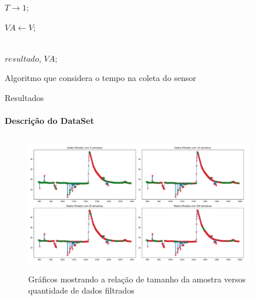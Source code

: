 \documentclass[]{beamer}
\begin{document}
\begin{frame}[allowframebreaks]
{\begin{algorithm}[H]
{{				
				$T \rightarrow 1$;   \\
	
	
				$VA \leftarrow V$;  \\
			}
	
	
			 \\
			\Retorna $resultado$, $VA$; 
		}
		\caption{Algoritmo que considera o tempo na coleta do sensor}
		\label{algoritmo:alg_com_temp}
	\end{algorithm}
	}

\end{frame}

\begin{frame}{Resultados}
	\framesubtitle{Descrição do DataSet}
	\begin{figure}[!htb]	
		\begin{center}
			\includegraphics[width=10cm,height=6cm]{../imagens/sensores/graficos_tamanhos_amostras.jpg}
		\end{center}
		\caption{Gráficos mostrando a relação de tamanho da amostra versos quantidade de dados filtrados}
		\label{figura:bruto}
	\end{figure}	
\end{frame}
\end{document}

